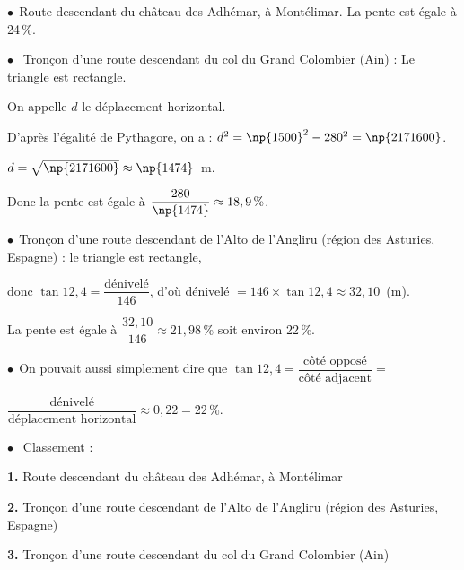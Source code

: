 
\medskip

$\bullet~~$Route descendant du château des  Adhémar, à Montélimar. La pente est égale à 24\,\%.

$\bullet~~$ Tronçon d'une route descendant du col du Grand Colombier (Ain) :
Le triangle est rectangle. 

On appelle $d$ le déplacement horizontal.

D'après l'égalité de Pythagore, on a : $d^2 = \np{1500}^2 - 280^2 = \np{2171600}$.

$ d = \sqrt{\np{2171600}} \approx  \np{1474}$~m.

Donc la pente est égale à  $\dfrac{280}{\np{1474}} \approx 18,9\,\%$.

$\bullet~~$Tronçon d'une route descendant de l'Alto de l'Angliru (région des Asturies, Espagne) :
le triangle est rectangle,

donc $\tan 12,4 = \dfrac{\text{dénivelé}}{146}$, d'où dénivelé $ = 146 \times \tan 12,4 \approx 32,10$~(m).

La pente est égale à $\dfrac{32,10}{146} \approx 21,98\,\%$ soit environ 22\,\%.

$\bullet~~$On pouvait aussi simplement dire que $\tan 12,4 = \dfrac{\text{côté opposé}}{\text{côté adjacent}} =$

$ \dfrac{\text{dénivelé}}{\text{déplacement horizontal}} \approx 0,22 = 22$\,\%. 

$\bullet~~$ Classement : 

\textbf{1.} Route descendant du château des Adhémar, à Montélimar

\textbf{2.} Tronçon d'une route descendant de l'Alto de l'Angliru (région des Asturies, Espagne)

\textbf{3.} Tronçon d'une route descendant du col du Grand Colombier (Ain)

\vspace{0,5cm}

